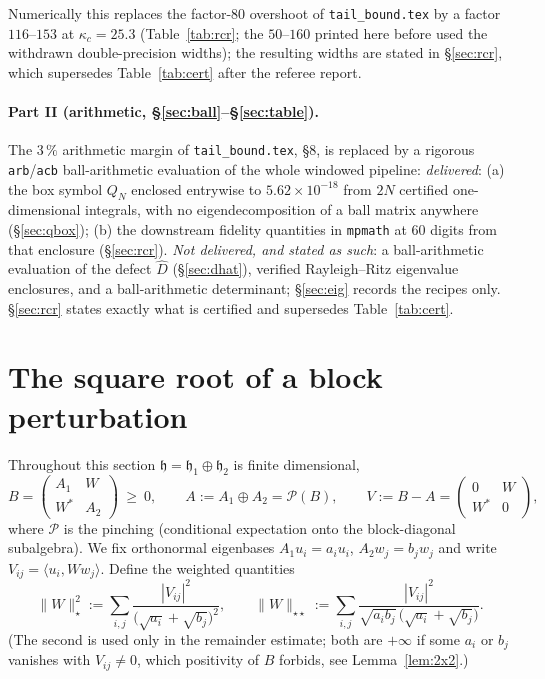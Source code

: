 \documentclass[11pt]{article}
\newcommand{\Nst}[1]{\lVert #1\rVert_{\star}}\newcommand{\Nsto}[1]{\lVert #1\rVert_{\star\star}}\newcommand{\Pinch}{\mathcal P}
\begin{document}
Numerically this replaces the factor-$80$ overshoot of \texttt{tail\_bound.tex} by a factor
$116$--$153$ at $\kappa_c=25.3$ (Table~\ref{tab:rcr}; the $50$--$160$ printed here before used the withdrawn double-precision widths); the resulting widths are stated in \S\ref{sec:rcr}, which supersedes
Table~\ref{tab:cert} after the referee report.

\paragraph{Part II (arithmetic, \S\ref{sec:ball}--\S\ref{sec:table}).}  The $3\,\%$ arithmetic margin
of \texttt{tail\_bound.tex}, \S8, is replaced by a rigorous \texttt{arb}/\texttt{acb} ball-arithmetic
evaluation of the whole windowed pipeline: \emph{delivered}: (a) the box symbol $Q_N$ enclosed
entrywise to $5.62\times10^{-18}$ from $2N$ certified one-dimensional integrals, with no
eigendecomposition of a ball matrix anywhere (\S\ref{sec:qbox}); (b) the downstream fidelity
quantities in \texttt{mpmath} at $60$ digits from that enclosure (\S\ref{sec:rcr}).
\emph{Not delivered, and stated as such}: a ball-arithmetic evaluation of the defect $\widehat D$
(\S\ref{sec:dhat}), verified Rayleigh--Ritz eigenvalue enclosures, and a ball-arithmetic
determinant; \S\ref{sec:eig} records the recipes only.  \S\ref{sec:rcr} states exactly what is
certified and supersedes Table~\ref{tab:cert}.
\section{The square root of a block perturbation}\label{sec:sqrt}

Throughout this section $\mathfrak h=\mathfrak h_1\oplus\mathfrak h_2$ is finite dimensional,
\[
 B=\begin{pmatrix}A_1&W\\ W^*&A_2\end{pmatrix}\ \ge\ 0,\qquad
 A:=A_1\oplus A_2=\Pinch(B),\qquad V:=B-A=\begin{pmatrix}0&W\\ W^*&0\end{pmatrix},
\]
where $\Pinch$ is the pinching (conditional expectation onto the block-diagonal subalgebra).  We fix
orthonormal eigenbases $A_1u_i=a_iu_i$, $A_2w_j=b_jw_j$ and write $V_{ij}=\langle u_i,Ww_j\rangle$.
Define the weighted quantities
\begin{equation}\label{eq:starnorm}
 \Nst{W}^2:=\sum_{i,j}\frac{|V_{ij}|^2}{\bigl(\sqrt{a_i}+\sqrt{b_j}\bigr)^2},
 \qquad
 \Nsto{W}:=\sum_{i,j}\frac{|V_{ij}|^2}{\sqrt{a_ib_j}\,\bigl(\sqrt{a_i}+\sqrt{b_j}\bigr)} .
\end{equation}
(The second is used only in the remainder estimate; both are $+\infty$ if some $a_i$ or $b_j$
vanishes with $V_{ij}\neq0$, which positivity of $B$ forbids, see Lemma~\ref{lem:2x2}.)
\end{document}
